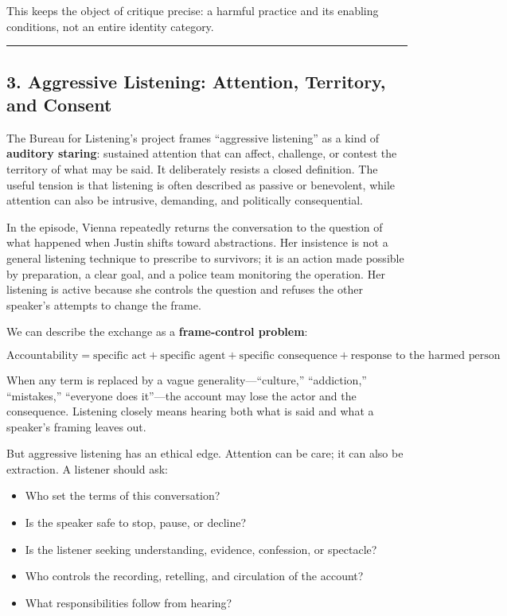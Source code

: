 \documentclass[
  11pt,
  letterpaper,
]{article}
\providecommand{\tightlist}{%
  \setlength{\itemsep}{0pt}\setlength{\parskip}{0pt}}
\begin{document}
This keeps the object of critique precise: a harmful practice and its
enabling conditions, not an entire identity category.

\begin{center}\rule{0.5\linewidth}{0.5pt}\end{center}

\subsection{3. Aggressive Listening: Attention, Territory, and
Consent}\label{aggressive-listening-attention-territory-and-consent}

The Bureau for Listening's project frames ``aggressive listening'' as a
kind of \textbf{auditory staring}: sustained attention that can affect,
challenge, or contest the territory of what may be said. It deliberately
resists a closed definition. The useful tension is that listening is
often described as passive or benevolent, while attention can also be
intrusive, demanding, and politically consequential.

In the episode, Vienna repeatedly returns the conversation to the
question of what happened when Justin shifts toward abstractions. Her
insistence is not a general listening technique to prescribe to
survivors; it is an action made possible by preparation, a clear goal,
and a police team monitoring the operation. Her listening is active
because she controls the question and refuses the other speaker's
attempts to change the frame.

We can describe the exchange as a \textbf{frame-control problem}:

\[
\text{Accountability} =
\text{specific act}
+ \text{specific agent}
+ \text{specific consequence}
+ \text{response to the harmed person}
\]

When any term is replaced by a vague generality---``culture,''
``addiction,'' ``mistakes,'' ``everyone does it''---the account may lose
the actor and the consequence. Listening closely means hearing both what
is said and what a speaker's framing leaves out.

But aggressive listening has an ethical edge. Attention can be care; it
can also be extraction. A listener should ask:

\begin{itemize}
\tightlist
\item
  Who set the terms of this conversation?
\item
  Is the speaker safe to stop, pause, or decline?
\item
  Is the listener seeking understanding, evidence, confession, or
  spectacle?
\item
  Who controls the recording, retelling, and circulation of the account?
\item
  What responsibilities follow from hearing?
\end{itemize}
\end{document}
